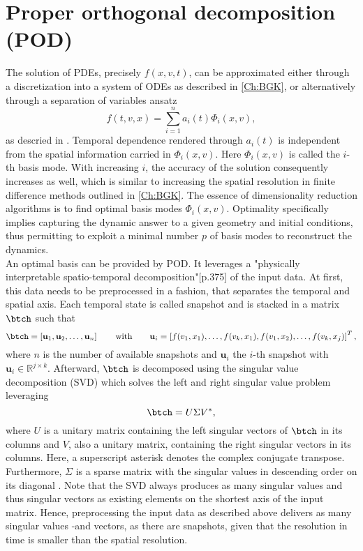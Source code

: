 \section{Proper orthogonal decomposition (POD)}
\label{Sec: POD}
The solution of PDEs, precisely \(f(x,v,t)\), can be approximated either through a discretization into a system of ODEs as described in \cref{Ch:BGK}, or alternatively through a separation of variables ansatz
\begin{equation}
	f(t,v,x) = \sum_{i=1}^n a_i(t)\Phi_i(x,v)\mathrm{,}
\end{equation}  
as descried in \cite{Kutz}. Temporal dependence rendered through \(a_i(t)\) is independent from the spatial information carried in \(\Phi_i(x,v)\). Here \(\Phi_i(x,v)\) is called the \(i\)-th basis mode. With increasing \(i\), the accuracy of the solution consequently increases as well, which is similar to increasing the spatial resolution in finite difference methods outlined in \cref{Ch:BGK}. The essence of dimensionality reduction algorithms is to find optimal basis modes \(\Phi_i(x,v)\). Optimality specifically implies capturing the dynamic answer to a given geometry and initial conditions, thus permitting to exploit a minimal number \(p\) of basis modes to reconstruct the dynamics.\\
An optimal basis can be provided by POD. It leverages a "physically interpretable spatio-temporal decomposition"\cite{Kutz}[p.375] of the input data. At first, this data needs to be preprocessed in a fashion, that separates the temporal and spatial axis. Each temporal state is called snapshot and is stacked in a matrix \(\btch\) such that
\begin{equation}
	\btch=\left[ \mathbf{u}_{1},\mathbf{u}_2,\dots,\mathbf{u}_n \right] \qquad \mathrm{with}\qquad \mathbf{u}_i=\left[f(v_1,x_1),\dots,f(v_k,x_1),f(v_1,x_2),\dots,f(v_k,x_j)\right]^T \mathrm{,}
	\label{Eq:PiPOD}
\end{equation}
where \(n\) is the number of available snapshots and \(\mathbf{u}_i\) the \(i\)-th snapshot with \(\mathbf{u}_i \in \mathbb{R}^{j\times k}\). Afterward, \(\btch\) is decomposed using the singular value decomposition (SVD) which solves the left and right singular value problem leveraging
\begin{equation}
\btch = U\Sigma V^*\mathrm{,}
\end{equation}
where \(U\) is a unitary matrix containing the left singular vectors of \(\btch\) in its columns and \(V\), also a unitary matrix, containing the right singular vectors in its columns. Here, a superscript asterisk denotes the complex conjugate transpose. Furthermore, \(\Sigma\) is a sparse matrix with the singular values in descending order on its diagonal \cite{Kutz}. Note that the SVD always produces as many singular values and thus singular vectors as existing elements on the shortest axis of the input matrix. Hence, preprocessing the input data as described above delivers as many singular values -and vectors, as there are snapshots, given that the resolution in time is smaller than the spatial resolution.\\

